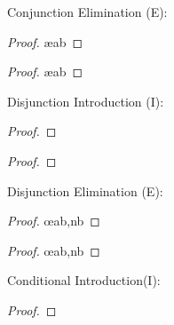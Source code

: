 Conjunction Elimination ({\eand}E):

\begin{multicols}{2}
\begin{proof}
         \ae{ab}
\end{proof}

\begin{proof}
         \ae{ab}
\end{proof}
\end{multicols}




Disjunction Introduction ({\eor}I):

\begin{multicols}{2}
 
\begin{proof}
\end{proof}

\begin{proof}
\end{proof}

\end{multicols}
  

Disjunction Elimination ({\eor}E):

\begin{multicols}{2}
\begin{proof}
         \oe{ab,nb}
\end{proof}

\begin{proof}
         \oe{ab,nb}
\end{proof}
\end{multicols}


Conditional Introduction({\eif}I):

\begin{proof}
        \open
                 
        \close
\end{proof}



